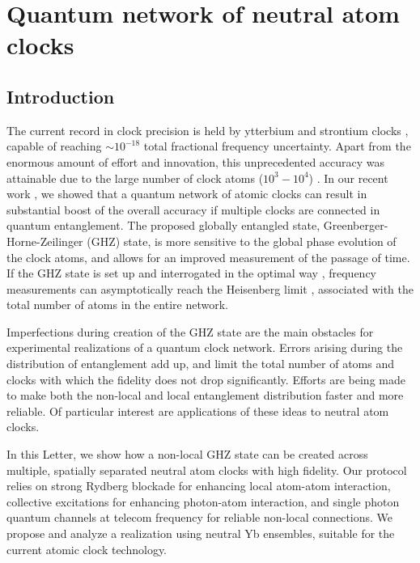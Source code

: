 \chapter{Quantum network of neutral atom clocks}
\label{ch:Komar2015}

\section{Introduction} 
The current record in clock precision is held by ytterbium and strontium clocks
\cite{Ludlow2015}, capable of reaching $\sim 10^{-18}$ total fractional
frequency uncertainty. Apart from the enormous amount of effort and innovation,
this unprecedented accuracy was attainable due to the large number of clock
atoms ($10^3-10^4$) \cite{Hinkley2013, Bloom2014, Nicholson2015}.
In our recent work \cite{Komar2014}, we showed that a quantum network of atomic
clocks can result in substantial boost of the overall accuracy if multiple
clocks are connected in quantum entanglement. The proposed globally entangled
state, Greenberger-Horne-Zeilinger (GHZ) state, is more sensitive to the global
phase evolution of the clock atoms, and allows for an improved measurement of
the passage of time. If the GHZ state is set up and interrogated in the optimal
way \cite{Kessler2014, Berry2009}, frequency measurements can asymptotically
reach the Heisenberg limit \cite{Hall2012}, associated with the total number of
atoms in the entire network.
 
Imperfections during creation of the GHZ state are the main obstacles for
experimental realizations of a quantum clock network. Errors arising during the
distribution of entanglement add up, and limit the total number of atoms and
clocks with which the fidelity does not drop significantly. Efforts are being
made to make both the non-local \cite{Sangouard2011} and local entanglement
distribution \cite{Sorensen1999, Saffman2010} faster and more reliable. Of
particular interest are applications of these ideas to neutral atom clocks.

In this Letter, we show how a non-local  GHZ state can be created across
multiple, spatially separated neutral atom clocks with high fidelity. Our
protocol relies on strong Rydberg blockade for enhancing local atom-atom
interaction, collective excitations for enhancing photon-atom interaction, and
single photon quantum channels at telecom frequency for reliable non-local
connections. We propose and analyze a realization using neutral Yb ensembles,
suitable for the current atomic clock technology.

